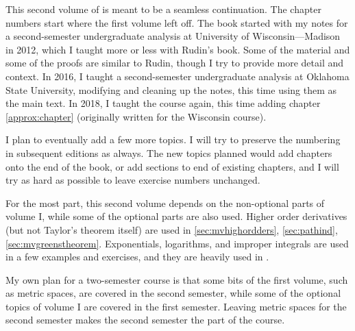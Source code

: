 
This second volume of  is meant to
be a seamless continuation.  The chapter numbers start where the
first volume left off.  The book started with my notes for a second-semester
undergraduate analysis at University of Wisconsin---Madison in 2012, which
I taught more or less with Rudin's book.  Some of the
material and some of the proofs are similar to Rudin, though I try
to provide more detail and context.
In 2016, I taught a second-semester
undergraduate analysis at Oklahoma State University, modifying
and cleaning up the notes, this time using them as the main text.
In 2018, I taught the course again, this time adding chapter
\ref{approx:chapter} (originally written for the Wisconsin course).

I plan to eventually add a few more topics.
I will try to preserve the numbering in subsequent editions as always.
The new topics planned would add chapters onto the end of the
book, or add sections to end of existing chapters, and I will try as hard as
possible to leave exercise numbers unchanged.

For the most part, this second volume
depends on the non-optional parts of volume I\@,
while some of the optional parts are also used.
Higher order derivatives (but not Taylor's theorem
itself) are used
in \ref{sec:mvhighordders}, \ref{sec:pathind},
\ref{sec:mvgreenstheorem}.  Exponentials, logarithms, and improper integrals are
used in a few examples and exercises, and they are heavily used in
.

My own plan for a
two-semester course is that some bits of the
first volume, such as metric spaces, are
covered in the second semester, while some of the optional topics of volume
I are covered in the first semester.  Leaving metric spaces for the second
semester makes the second
semester the  part of the course.

